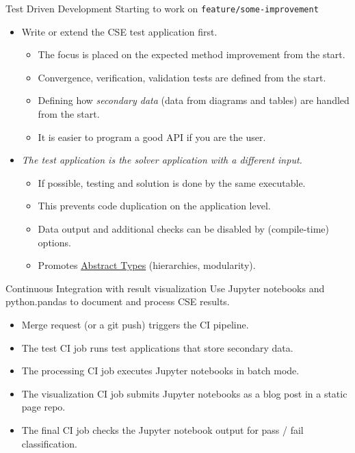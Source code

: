 \documentclass[
	ngerman,%
	aspectratio=169,%
	color={accentcolor=2d},
	logo=true,%
	colorframetitle=true,%
	]{tudabeamer}
\begin{document}
\begin{frame}{Test Driven Development} 
	\vfill
	Starting to work on \texttt{feature/some-improvement} 
	\begin{itemize}
		\item Write or extend the CSE test application first. 
			\begin{itemize}
				\item The focus is placed on the expected method improvement from the start. 
				\item Convergence, verification, validation tests are defined from the start.
				\item Defining how \emph{secondary data} (data from diagrams and tables) are handled from the start.  
				\item It is easier to program a good API if you are the user. 
			\end{itemize}
		\item \emph{The test application is the solver application with a different input.}
			\begin{itemize}
				\item If possible, testing and solution is done by the same executable.  
				\item This prevents code duplication on the application level. 
				\item Data output and additional checks can be disabled by (compile-time) options.
				\item Promotes \href{https://en.wikipedia.org/wiki/Abstract_type}{Abstract Types} (hierarchies, modularity).
			\end{itemize}
	\end{itemize}

\end{frame}

\begin{frame}{Continuous Integration with result visualization} 
	\vfill
	Use Jupyter notebooks and python.pandas to document and process CSE results. 
	\begin{itemize}
		\item Merge request (or a git push) triggers the CI pipeline.
		\item The test CI job runs test applications that store secondary data. 
		\item The processing CI job executes Jupyter notebooks in batch mode.  
		\item The visualization CI job submits Jupyter notebooks as a blog post in a static page repo. 
		\item The final CI job checks the Jupyter notebook output for pass / fail classification. 
	\end{itemize}

\end{frame}
\end{document}
